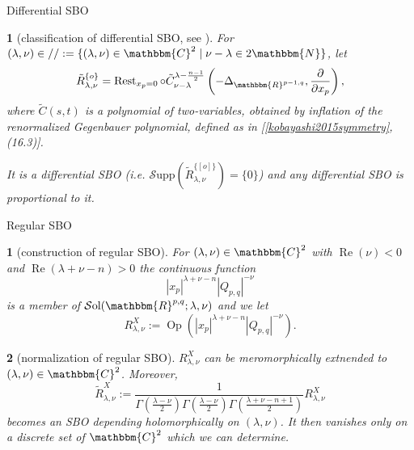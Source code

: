 \documentclass[notes,notheorems]{beamer}
\newcommand{\tmop}[1]{\ensuremath{\operatorname{#1}}}
\newcommand{\assign}{:=}
\newtheorem{theorem}{\translate{Theorem}}[section]
\newtheorem{theorem}{\translate{Theorem}}
\newtheorem{fact}{\translate{Fact}}
\theoremstyle{definition}
\theoremstyle{example}
\theoremstyle{plain}
\theoremstyle{mystyle}
\begin{document}
\begin{frame}{Differential SBO}
	\begin{fact}[classification of differential SBO, see \cite{kobayashi2015branching}]
For $(\lambda, \nu) \in / / \assign \{
(\lambda, \nu) \in \mathbbm{C}^2 \mid \nu - \lambda \in 2\mathbbm{N} \}$, let
\begin{equation*}
	\tilde{R}_{\lambda, \nu}^{\{ o \}} =
\tmop{Rest}_{x_p = 0} \circ \tilde{C}_{\nu - \lambda}^{\lambda - \frac{n -
1}{2}} \left( - \Delta_{\mathbbm{R}^{p - 1, q}}, \frac{\partial}{\partial x_p}
\right),
\end{equation*}
where $\tilde{C} (s, t)$ is a polynomial of two-variables, obtained by
inflation of the renormalized Gegenbauer polynomial, defined as in
[\ref{kobayashi2015symmetry}, (16.3)].{

}It is a differential SBO (i.e. $\mathcal{S}\mbox{upp} (\tilde{R}_{\lambda,
\nu}^{\{ [o] \}}) = \{ 0 \}$) and any differential SBO is proportional to it.
	\end{fact}
\end{frame}
\begin{frame}{Regular SBO}
	\begin{theorem}[construction of regular SBO]
For
$(\lambda, \nu) \in \mathbbm{C}^2$ with $\tmop{Re} (\nu) < 0$ and $\tmop{Re}
(\lambda + \nu - n) > 0$ the continuous function
\begin{equation*}
	| x_p |^{\lambda + \nu - n} | Q_{p, q} |^{- \nu}
\end{equation*}
is a member of $\mathcal{S} \mbox{ol} (\mathbbm{R}^{p, q} ; \lambda, \nu)$
and we let
\vspace{-0.5em}
\begin{equation*}
	R_{\lambda, \nu}^X \assign \tmop{Op} (| x_p
|^{\lambda + \nu - n} | Q_{p, q} |^{- \nu}) .
\end{equation*}
	\end{theorem}
\vspace{-0.4em}
	\begin{theorem}[normalization of regular SBO]
$R_{\lambda, \nu}^X$ can be meromorphically extnended to $(\lambda, \nu) \in
\mathbbm{C}^2$. Moreover,
\vspace{-1.1em}
\begin{equation*}
	\tilde{R}_{\lambda, \nu}^X \assign \frac{1}{\Gamma
\left( \frac{\lambda - \nu}{2} \right) \Gamma \left( \frac{\lambda - \nu}{2}
\right) \Gamma \left( \frac{\lambda + \nu - n + 1}{2} \right)} R_{\lambda,
\nu}^X
\end{equation*}
becomes an SBO depending holomorphically on $(\lambda, \nu)$. It then
vanishes only on a discrete set of $\mathbbm{C}^2$ which we can determine.
	\end{theorem}
\end{frame}
\end{document}
